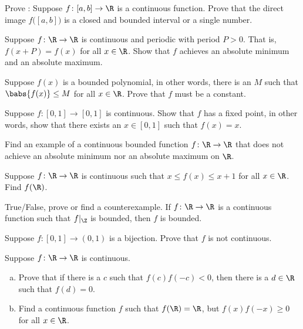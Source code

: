 \begin{exercise}
Prove :
Suppose $f \colon [a,b] \to \R$ is a continuous function.  Prove
that the direct image $f\bigl([a,b]\bigr)$ is a closed and bounded interval or
a single number.
\end{exercise}

\begin{exercise}
Suppose $f \colon \R \to \R$ is continuous and periodic with period
$P > 0$.  That is, $f(x+P) = f(x)$ for all $x \in \R$.  Show that $f$
achieves an absolute minimum and an absolute maximum.
\end{exercise}

\begin{exercise}[Challenging]
Suppose $f(x)$ is a bounded polynomial,
in other words, there is an $M$ such that $\babs{f(x)} \leq M$
for all $x \in \R$.  Prove that $f$ must be a constant.
\end{exercise}

\begin{exercise}
Suppose $f \colon [0,1] \to [0,1]$ is continuous.  Show that $f$
has a fixed point, in other words, show that there exists an $x \in [0,1]$ such that
$f(x) = x$.
\end{exercise}

\begin{exercise}
Find an example of a continuous bounded function $f \colon \R \to \R$ that does
not achieve an absolute minimum nor an absolute maximum on $\R$.
\end{exercise}

\begin{exercise}
Suppose $f \colon \R \to \R$ is continuous such that
$x \leq f(x) \leq x+1$ for all $x \in \R$.  Find $f(\R)$.
\end{exercise}

\begin{exercise}
True/False, prove or find a counterexample.  If $f \colon \R \to
\R$ is a continuous function such that $f|_{\Z}$ is bounded, then $f$
is bounded.
\end{exercise}

\begin{exercise}
Suppose $f \colon [0,1] \to (0,1)$ is a bijection.  Prove that $f$ is not
continuous.
\end{exercise}

\begin{exercise}
Suppose $f \colon \R \to \R$ is continuous.
\begin{enumerate}[a)]
\item
Prove that if there is a $c$ such that $f(c)f(-c) < 0$,
then there is a $d \in \R$ such that $f(d) = 0$.
\item
Find a continuous function $f$ such that
$f(\R) = \R$, but $f(x)f(-x) \geq 0$ for all $x \in \R$.
\end{enumerate}
\end{exercise}

